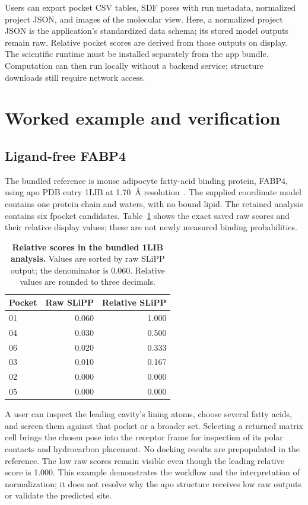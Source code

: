 \documentclass[10pt,a4paper]{article}
\begin{document}
Users can export pocket CSV tables, SDF poses with run metadata, normalized project JSON, and images of the molecular view. Here, a normalized project JSON is the application's standardized data schema; its stored model outputs remain raw. Relative pocket scores are derived from those outputs on display. The scientific runtime must be installed separately from the app bundle. Computation can then run locally without a backend service; structure downloads still require network access.

\section{Worked example and verification}
\subsection{Ligand-free FABP4}
The bundled reference is mouse adipocyte fatty-acid binding protein, FABP4, using apo PDB entry 1LIB at 1.70~\AA{} resolution~\cite{fabp4}. The supplied coordinate model contains one protein chain and waters, with no bound lipid. The retained analysis contains six fpocket candidates. Table~\ref{tab:normalization} shows the exact saved raw scores and their relative display values; these are not newly measured binding probabilities.

\begin{table}[tb]
\caption{\textbf{Relative scores in the bundled 1LIB analysis.} Values are sorted by raw SLiPP output; the denominator is 0.060. Relative values are rounded to three decimals.}
\label{tab:normalization}
\centering\small
\begin{tabular*}{\columnwidth}{@{\extracolsep{\fill}}lrr@{}}
\toprule Pocket & Raw SLiPP & Relative SLiPP\\\midrule
01 & 0.060 & 1.000\\
04 & 0.030 & 0.500\\
06 & 0.020 & 0.333\\
03 & 0.010 & 0.167\\
02 & 0.000 & 0.000\\
05 & 0.000 & 0.000\\\bottomrule
\end{tabular*}
\end{table}

A user can inspect the leading cavity's lining atoms, choose several fatty acids, and screen them against that pocket or a broader set. Selecting a returned matrix cell brings the chosen pose into the receptor frame for inspection of its polar contacts and hydrocarbon placement. No docking results are prepopulated in the reference. The low raw scores remain visible even though the leading relative score is 1.000. This example demonstrates the workflow and the interpretation of normalization; it does not resolve why the apo structure receives low raw outputs or validate the predicted site.
\end{document}

